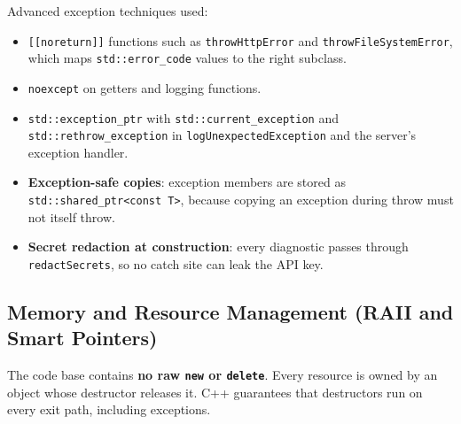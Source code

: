 \documentclass[12pt,a4paper,oneside]{book}
\begin{document}
Advanced exception techniques used:
\begin{itemize}
  \item \texttt{[[noreturn]]} functions such as \texttt{throwHttpError} and
    \texttt{throwFileSystemError}, which maps \texttt{std::\allowbreak{}error\_code}
    values to the right subclass.
  \item \texttt{noexcept} on getters and logging functions.
  \item \texttt{std::\allowbreak{}exception\_ptr} with \texttt{std::\allowbreak{}current\_exception} and
    \texttt{std::\allowbreak{}rethrow\_exception} in \texttt{logUnexpectedException} and
    the server's exception handler.
  \item \textbf{Exception-safe copies}: exception members are stored as
    \texttt{std::\allowbreak{}shared\_ptr<const T>}, because copying an exception during
    throw must not itself throw.
  \item \textbf{Secret redaction at construction}: every diagnostic passes
    through \texttt{redactSecrets}, so no catch site can leak the API key.
\end{itemize}

\renewcommand{\floatpagefraction}{0.8}
\subsection{Memory and Resource Management (RAII and Smart Pointers)}

The code base contains \textbf{no raw \texttt{new} or \texttt{delete}}. Every
resource is owned by an object whose destructor releases it. C++ guarantees
that destructors run on every exit path, including exceptions.
\end{document}

